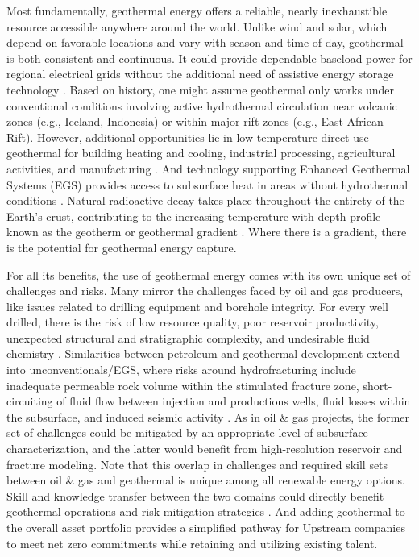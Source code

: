 Most fundamentally, geothermal energy offers a reliable, nearly inexhaustible resource accessible anywhere around the world. Unlike wind and solar, which depend on favorable locations and vary with season and time of day, geothermal is both consistent and continuous. It could provide dependable baseload power for regional electrical grids without the additional need of assistive energy storage technology \citep{tester_future_2006}. Based on history, one might assume geothermal only works under conventional conditions involving active hydrothermal circulation near volcanic zones (e.g., Iceland, Indonesia) or within major rift zones (e.g., East African Rift). However, additional opportunities lie in low-temperature direct-use geothermal for building heating and cooling, industrial processing, agricultural activities, and manufacturing \citep{glassley_geothermal_2015}. And technology supporting Enhanced Geothermal Systems (EGS) provides access to subsurface heat in areas without hydrothermal conditions \citep{tester_future_2006}. Natural radioactive decay takes place throughout the entirety of the Earth’s crust, contributing to the increasing temperature with depth profile known as the geotherm or geothermal gradient \citep{fowler_solid_2005}. Where there is a gradient, there is the potential for geothermal energy capture.

For all its benefits, the use of geothermal energy comes with its own unique set of challenges and risks. Many mirror the challenges faced by oil and gas producers, like issues related to drilling equipment and borehole integrity. For every well drilled, there is the risk of low resource quality, poor reservoir productivity, unexpected structural and stratigraphic complexity, and undesirable fluid chemistry \citep{beckers_low-temperature_2016, hadi_resource_2010}. Similarities between petroleum and geothermal development extend into unconventionals/EGS, where risks around hydrofracturing include inadequate permeable rock volume within the stimulated fracture zone, short-circuiting of fluid flow between injection and productions wells, fluid losses within the subsurface, and induced seismic activity \citep{jelacic_evaluation_2008,pan_establishment_2019}. As in oil \& gas projects, the former set of challenges could be mitigated by an appropriate level of subsurface characterization, and the latter would benefit from high-resolution reservoir and fracture modeling. Note that this overlap in challenges and required skill sets between oil \& gas and geothermal is unique among all renewable energy options. Skill and knowledge transfer between the two domains could directly benefit geothermal operations and risk mitigation strategies \citep{petty_synergies_2009}. And adding geothermal to the overall asset portfolio provides a simplified pathway for Upstream companies to meet net zero commitments while retaining and utilizing existing talent.

